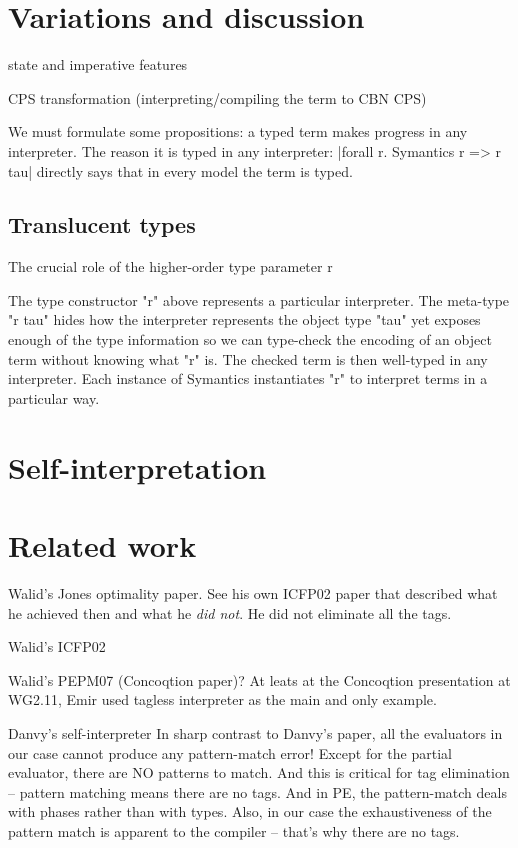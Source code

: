 \documentclass[preprint]{sigplanconf}
\begin{document}
\section{Variations and discussion}

state and imperative features

CPS transformation (interpreting/compiling the term to CBN CPS)

We must formulate some propositions: a typed term makes progress in
any interpreter. The reason it is typed in any interpreter:
|forall r. Symantics r => r tau| directly says that in every model the
term is typed. 

\subsection{Translucent types}
The crucial role of the higher-order type parameter r

The type constructor "r" above represents a particular interpreter.  The
meta-type "r tau" hides how the interpreter represents the object type
"tau" yet exposes enough of the type information so we can type-check
the encoding of an object term without knowing what "r" is.  The checked
term is then well-typed in any interpreter.  Each instance of Symantics
instantiates "r" to interpret terms in a particular way.

\section{Self-interpretation}



\section{Related work}
Walid's Jones optimality paper. See his own ICFP02 paper that
described what he achieved then and what he \emph{did not}. He did not
eliminate all the tags.

Walid's ICFP02

Walid's PEPM07 (Concoqtion paper)? At leats at the Concoqtion
presentation at WG2.11, Emir used tagless interpreter as the main and
only example.

Danvy's self-interpreter
In sharp contrast to Danvy's paper, all the evaluators in our case
cannot produce any pattern-match error! Except for the partial
evaluator, there are NO patterns to match. And this is critical for
tag elimination -- pattern matching means there are no tags. And in
PE, the pattern-match deals with phases rather than with types. Also,
in our case the exhaustiveness of the pattern match is apparent to the
compiler -- that's why there are no tags.
\end{document}
